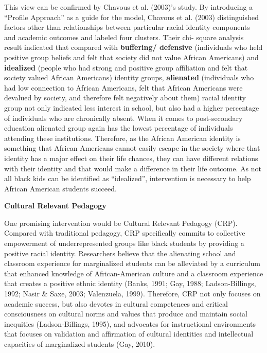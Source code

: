 \noindent This view can be confirmed by Chavous et al. (2003)’s study. By introducing a “Profile Approach” as a guide for the model, Chavous et al. (2003) distinguished factors other than relationships between particular racial identity components and academic outcomes and labeled four clusters. Their chi- square analysis result indicated that compared with \textbf{buffering/ defensive} (individuals who held positive group beliefs and felt that society did not value African Americans) and \textbf{idealized} (people who had strong and positive group affiliation and felt that society valued African Americans) identity groups, \textbf{alienated} (individuals who had low connection to African Americans, felt that African Americans were devalued by society, and therefore felt negatively about them) racial identity group not only indicated less interest in school, but also had a higher percentage of individuals who are chronically absent. When it comes to post-secondary education alienated group again has the lowest percentage of individuals attending these institutions. Therefore, as the African American identity is something that African Americans cannot easily escape in the society where that identity has a major effect on their life chances, they can have different relations with their identity and that would make a difference in their life outcome. As not all black kids can be identified as “idealized”, intervention is necessary to help African American students succeed. 

\noindent\textbf{Cultural Relevant Pedagogy}

\noindent One promising intervention would be Cultural Relevant Pedagogy (CRP). Compared with traditional pedagogy, CRP specifically commits to collective empowerment of underrepresented groups like black students by providing a positive racial identity. Researchers believe that the alienating school and classroom experience for marginalized students can be alleviated by a curriculum that enhanced knowledge of African-American culture and a classroom experience that creates a positive ethnic identity (Banks, 1991; Gay, 1988; Ladson-Billings, 1992; Nasir & Saxe, 2003; Valenzuela, 1999). Therefore, CRP not only focuses on academic success, but also devotes in cultural competences and critical consciousness on cultural norms and values that produce and maintain social inequities (Ladson‐Billings, 1995), and advocates for instructional environments that focuses on validation and affirmation of cultural identities and intellectual capacities of marginalized students (Gay, 2010). 

